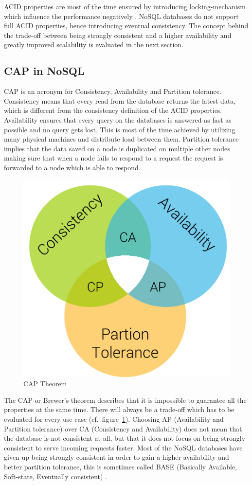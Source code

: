 ACID properties are most of the time ensured by introducing locking-mechanism which influence the performance negatively \cite[1]{hecht.2011}. NoSQL databases do not support full ACID properties, hence introducing eventual consistency. The concept behind the trade-off between being strongly consistent and a higher availability and greatly improved scalability is evaluated in the next section.


\subsection{CAP in NoSQL}
\label{subsec:cap}
CAP is an acronym for Consistency, Availability and Partition tolerance. Consistency means that every read from the database returns the latest data, which is different from the consistency definition of the ACID properties. Availability ensures that every query on the databases is answered as fast as possible and no query gets lost. This is most of the time achieved by utilizing many physical machines and distribute load between them. Partition tolerance implies that the data saved on a node is duplicated on multiple other nodes making sure that when a node fails to respond to a request the request is forwarded to a node which is able to respond. \cite[72]{pokorny.2011}

\begin{figure}[H]
  \centering
  \includegraphics[width=.4\textwidth]{Figures/cap.png}
  \caption[CAP Theorem]{CAP Theorem}
  \label{fig:cap-theorem}
\end{figure}

The CAP or Brewer's theorem describes that it is impossible to guarantee all the properties at the same time. There will always be a trade-off which has to be evaluated for every use case (cf.~figure~\ref{fig:cap-theorem}). Choosing AP (Availability and Partition tolerance) over CA (Consistency and Availability) does not mean that the database is not consistent at all, but that it does not focus on being strongly consistent to serve incoming requests faster. Most of the NoSQL databases have given up being strongly consistent in order to gain a higher availability and better partition tolerance, this is sometimes called BASE (Basically Available, Soft-state, Eventually consistent) \cite[4]{moniruzzaman.2013}.
